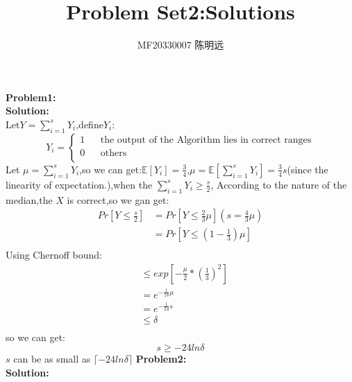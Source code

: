 \documentclass{article}
\author{MF20330007 陈明远}
\title{Problem Set2:Solutions}
\begin{document}
\maketitle
\noindent\textbf{Problem1:}\\\textbf{Solution:}\\
Let$Y = \sum_{i=1}^{s}Y_i$,define$Y_i$:
$$Y_i=\left\{
\begin{array}{rcl}
    1 &  & {\text{the output of the Algorithm lies in correct ranges}} \\
    0 &  & {\text{others}}\\ 
\end{array}   
\right.
$$
Let $\mu=\sum_{i=1}^{s}Y_i$,so we can get:$\mathbb{E}[Y_i]=\frac{3}{4}$,$\mu=\mathbb{E}[\sum_{i=1}^{s}Y_i]=\frac{3}{4}s$(since the linearity of
expectation.),when the $\sum_{i=1}^{s}Y_i \geq \frac{s}{2}$, According to the nature of the median,the $X$ is correct,so we gan get:$$
\begin{aligned}
    Pr[Y \leq \frac{s}{2}]&=Pr[Y \leq \frac{2}{3}\mu](s = \frac{4}{3}\mu)\\
    &=Pr[Y\leq (1-\frac{1}{3})\mu]\\
\end{aligned}$$Using Chernoff bound:$$
\begin{aligned}
    &\leq exp\left[-\frac{\mu}{2}*(\frac{1}{3})^2\right]\\
    &= e^{-\frac{1}{18}\mu}\\
    &=e^{-\frac{1}{24}s}\\
    &\leq \delta\\
\end{aligned}$$so we can get:
$$s \geq -24ln\delta$$ $s$ can be as small as $\lceil -24ln\delta \rceil$
\newpage \noindent\textbf{Problem2:}\\\textbf{Solution:}\\
\end{document}
